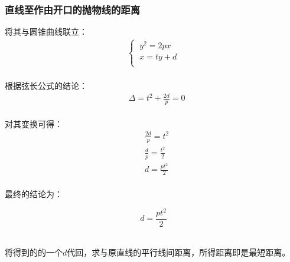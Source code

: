 \documentclass[UTF8]{ctexart}
\begin{document}
\subsubsection{直线至作由开口的抛物线的距离}
    将其与圆锥曲线联立：
    \setcounter{equation}{0}
    \begin{align}
        \begin{cases}
            ~y^2=2px\\[1mm]
            ~x=ty+d\\[1mm]
        \end{cases}
    \end{align}\\
    根据弦长公式的结论：
    \begin{align}
        &\Delta=t^2+\frac{2d}{p}=0
    \end{align}\\
    对其变换可得：
    \begin{align}
        &\frac{2d}{p}=t^2\\[3mm]
        &\frac{d}{p}=\frac{t^2}{2}\\[3mm]
        &d=\frac{pt^2}{2}
    \end{align}\\
    最终的结论为：
    \begin{large}
        \begin{equation*}
            d=\frac{pt^2}{2}
        \end{equation*}
    \end{large}\\
    将得到的的一个$d$代回，求与原直线的平行线间距离，所得距离即是最短距离。

\newpage
\end{document}
